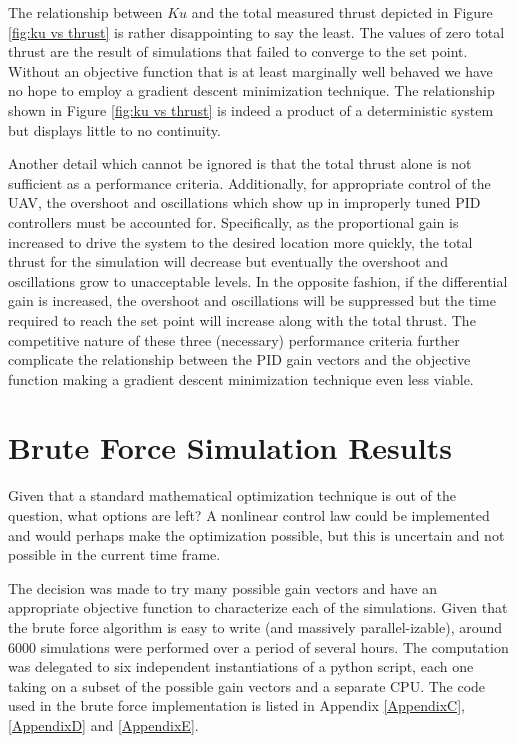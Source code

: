 The relationship between $Ku$ and the total measured thrust depicted in Figure \ref{fig:ku vs thrust} is rather disappointing to say the least. The values of zero total thrust are the result of simulations that failed to converge to the set point. Without an objective function that is at least marginally well behaved we have no hope to employ a gradient descent minimization technique. The relationship shown in Figure \ref{fig:ku vs thrust} is indeed a product of a deterministic system but displays little to no continuity.

Another detail which cannot be ignored is that the total thrust alone is not sufficient as a performance criteria. Additionally, for appropriate control of the UAV,  the overshoot and oscillations which show up in improperly tuned PID controllers must be accounted for. Specifically, as the proportional gain is increased to drive the system to the desired location more quickly, the total thrust for the simulation will decrease but eventually the overshoot and oscillations grow to unacceptable levels. In the opposite fashion, if the differential gain is increased, the overshoot and oscillations will be suppressed but the time required to reach the set point will increase along with the total thrust. The competitive nature of these three (necessary) performance criteria further complicate the relationship between the PID gain vectors and the objective function making a gradient descent minimization technique even less viable.


\section{Brute Force Simulation Results}

Given that a standard mathematical optimization technique is out of the question, what options are left? A nonlinear control law could be implemented and would perhaps make the optimization possible, but this is uncertain and not possible in the current time frame.

The decision was made to try many possible gain vectors and have an appropriate objective function to characterize each of the simulations. Given that  the brute force algorithm is easy to write (and massively parallel-izable), around 6000 simulations were performed over a period of several hours. The computation was delegated to six independent instantiations of a python script, each one taking on a subset of the possible gain vectors and a separate CPU. The code used in the brute force implementation is listed in Appendix \ref{AppendixC}, \ref{AppendixD} and \ref{AppendixE}.

